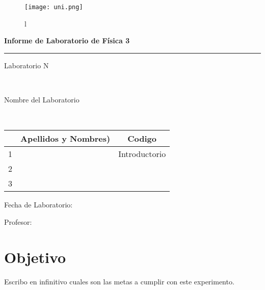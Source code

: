 \documentclass[a4paper,11pt]{article}
\begin{document}
\begin{center}
\begin{figure}[ht!]
\begin{minipage}[c]{0.2\linewidth}
\texttt{[image: uni.png]}
\end{minipage}
\hfill{}
\begin{minipage}{0,8\columnwidth}
\centering{}
\end{minipage}l
\end{figure}
\end{center}
\vspace*{-0.90cm}
\noindent
\begin{center}
\bfseries \Large Informe de Laboratorio de F\'isica 3 \\
\end{center}
\noindent

\rule{\textwidth}{1.5pt}
\newline
\begin{center}Laboratorio N\end{center} \\
\begin{center}Nombre del Laboratorio \end{center} \\
\begin{center}
    \begin{tabular}{ | c | c |c |}
    \hline
     &  \bf{Apellidos y Nombres)}   & Codigo \\ \hline
    1 &  &  Introductorio  \\  \hline
    2 &  &     \\  \hline
    3 & &   \\  \hline
    \end{tabular}
\end{center}


\begin{center} Fecha de Laboratorio: \end{center}
\begin{center}Profesor: \end{center}
\newpage
\section{Objetivo}
\noindent
Escribo en infinitivo cuales son las metas a cumplir con este experimento.\\
\end{document}
